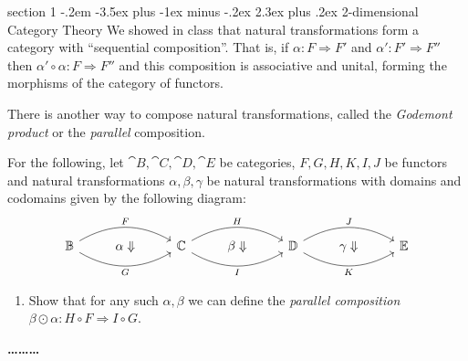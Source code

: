 \documentclass[12pt]{article}
\makeatletter
\newenvironment{problem}{\@startsection
       {section}
       {1}
       {-.2em}
       {-3.5ex plus -1ex minus -.2ex}
       {2.3ex plus .2ex}
       {\pagebreak[3]%
       \large\bf\noindent{Problem }
       }
       }
       {%
       \begin{center}\large\bf \ldots\ldots\ldots\end{center}}
\makeatother
\begin{document}
\begin{problem}{2-dimensional Category Theory}
  We showed in class that natural transformations form a category with
  ``sequential composition''. That is, if $\alpha : F \Rightarrow F'$
  and $\alpha' : F' \Rightarrow F''$ then $\alpha' \circ \alpha : F
  \Rightarrow F''$ and this composition is associative and unital,
  forming the morphisms of the category of functors.

  There is another way to compose natural transformations, called the
  \emph{Godemont product} or the \emph{parallel} composition.

  For the following, let $\cat B, \cat C,\cat D, \cat E$ be
  categories, $F,G,H,K,I,J$ be functors and natural transformations
  $\alpha,\beta,\gamma$ be natural transformations with domains and
  codomains given by the following diagram:
  \[%
\begin{tikzcd}
\mathbb B \arrow[rr, "F", bend left] \arrow[rr, "G"', bend right] & \alpha\Downarrow & \mathbb C \arrow[rr, "H", bend left] \arrow[rr, "I"', bend right] & \beta\Downarrow & \mathbb D \arrow[rr, "J", bend left] \arrow[rr, "K"', bend right] & \gamma\Downarrow & \mathbb E
\end{tikzcd}\]

\begin{enumerate}
\item Show that for any such $\alpha,\beta$ we can define the
  \emph{parallel composition} $\beta \odot \alpha : H \circ F
  \Rightarrow I \circ G$.


\end{enumerate}
\end{problem}
\end{document}
